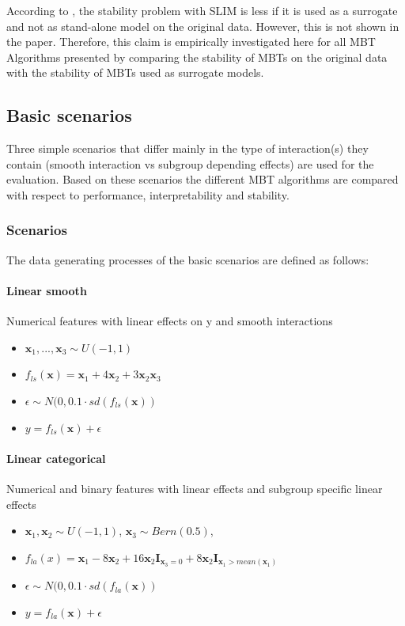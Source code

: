 According to \citep{Hu.2020}, the stability problem with SLIM is less if it is used as a surrogate and not as stand-alone model on the original data. However, this is not shown in the paper. Therefore, this claim is empirically investigated here for all MBT Algorithms presented by comparing the stability of MBTs on the original data with the stability of MBTs used as surrogate models.





\subsection{Basic scenarios}
Three simple scenarios that differ mainly in the type of interaction(s) they contain (smooth interaction vs subgroup depending effects) are used for the evaluation. Based on these scenarios the different MBT algorithms are compared with respect to performance, interpretability and stability.


\subsubsection{Scenarios}
The data generating processes of the basic scenarios are defined as follows:


\paragraph{Linear smooth}
Numerical features with linear effects on y and smooth interactions
\begin{itemize}
    \item $\textbf{x}_1,..., \textbf{x}_{3} \sim U(-1,1)$
    \item $ f_{ls}(\textbf{x}) = \textbf{x}_1 + 4   \textbf{x}_2 + 3   \textbf{x}_2   \textbf{x}_3 $
    \item $\epsilon \sim N(0, 0.1 \cdot sd(f_{ls}(\textbf{x}))$
    \item $y = f_{ls}(\textbf{x}) + \epsilon$
\end{itemize}             


\paragraph{Linear categorical}
Numerical and binary features with linear effects and subgroup specific linear effects
\begin{itemize}
    \item $\textbf{x}_1, \textbf{x}_2 \sim U(-1,1)$, $\textbf{x}_3 \sim Bern(0.5)$,  
    \item $ f_{la}(x) =  \textbf{x}_{1} - 8  \textbf{x}_2 + 16  \textbf{x}_2  \mathbf{I}_{\textbf{x}_3 = 0} + 8  \textbf{x}_2  \mathbf{I}_{\textbf{x}_1 > mean(\textbf{x}_1)} $
    \item $\epsilon \sim N(0, 0.1 \cdot sd(f_{la}(\textbf{x}))$
    \item $y = f_{la}(\textbf{x}) + \epsilon$          
\end{itemize}




